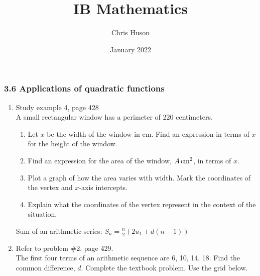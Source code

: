 \documentclass[12pt, twoside]{article}
\title{IB Mathematics}
\author{Chris Huson}
\date{January 2022}
\begin{document}
\subsubsection*{3.6 Applications of quadratic functions}
\begin{enumerate}
\item Study example 4, page 428\\[0.25cm]
A small rectangular window has a perimeter of 220 centimeters.
    \begin{enumerate}
        \item Let $x$ be the width of the window in cm. Find an expression in terms of $x$ for the height of the window. \vspace{2cm}
        \item Find an expression for the area of the window, $A \,\rm{cm}^2$, in terms of $x$.  \vspace{2cm}
        \item Plot a graph of how the area varies with width. Mark the coordinates of the vertex and $x$-axis intercepts.
        \item Explain what the coordinates of the vertex represent in the context of the situation. \vspace{2cm}
    \end{enumerate}
    \begin{center}
    \end{center}
    
\newpage
Sum of an arithmetic series: $\displaystyle S_n=\frac{n}{2}(2u_1+d(n-1))$
\item Refer to problem \#2, page 429.\\[0.25cm]
The first four terms of an arithmetic sequence are 6, 10, 14, 18. Find the common difference, $d$. Complete the textbook problem. Use the grid below.
\vspace{8cm}
\begin{center}
\end{center}


\end{enumerate}
\end{document}
